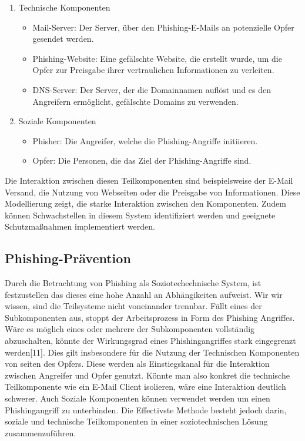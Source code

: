 \documentclass[journal=tosc,final]{iacrtrans}
\begin{document}
\begin{enumerate}
\item Technische Komponenten
\begin{itemize}
\item Mail-Server: Der Server, über den Phishing-E-Mails an potenzielle Opfer gesendet werden.
\item Phishing-Website: Eine gefälschte Website, die erstellt wurde, um die Opfer zur Preisgabe ihrer vertraulichen Informationen zu verleiten.
\item DNS-Server: Der Server, der die Domainnamen auflöst und es den Angreifern ermöglicht, gefälschte Domains zu verwenden.
\end{itemize}
\item Soziale Komponenten
\begin{itemize}
\item Phisher: Die Angreifer, welche die Phishing-Angriffe initiieren.
\item Opfer: Die Personen, die das Ziel der Phishing-Angriffe sind.
\end{itemize}
\end{enumerate}
Die Interaktion zwischen diesen Teilkomponenten sind beispielsweise der E-Mail Versand, die Nutzung von Webseiten oder die Preisgabe von Informationen. Diese Modellierung zeigt, die starke Interaktion zwischen den Komponenten. Zudem können Schwachstellen in diesem System identifiziert werden und geeignete Schutzmaßnahmen implementiert werden.
\subsection{Phishing-Prävention}
Durch die Betrachtung von Phishing als Soziotechechnische System, ist festzustellen das dieses eine hohe Anzahl an Abhängikeiten aufweist. Wir wir wissen, sind die Teilsysteme nicht voneinander trennbar. Fällt eines der Subkomponenten aus, stoppt der Arbeitsprozess in Form des Phishing Angriffes. Wäre es möglich eines oder mehrere der Subkomponenten vollständig  abzuschalten, könnte der Wirkungsgrad eines Phishingangriffes stark eingegrenzt werden[11]. Dies gilt insbesondere für die Nutzung der Technischen Komponenten von seiten des Opfers. Diese werden als Einstiegskanal für die Interaktion zwischen Angreifer und Opfer genutzt. Könnte man also konkret die technische Teilkomponente wie ein E-Mail Client isolieren, wäre eine Interaktion deutlich schwerer. Auch Soziale Komponenten können verwendet  werden um einen Phishingangriff zu unterbinden. Die Effectivste Methode besteht jedoch darin, soziale und technische Teilkomponenten in einer soziotechnischen Lösung zusammenzuführen.
\end{document}
